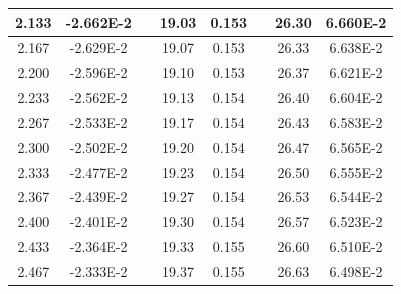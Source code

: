 \documentclass[article,12pt]{elsarticle}
\begin{document}
\begin{longtable}[c]{|c|c|cccccc}
2.133    & -2.662E-2 & \multicolumn{1}{c|}{} & \multicolumn{1}{c|}{19.03}   & \multicolumn{1}{c|}{0.153} & \multicolumn{1}{c|}{} & \multicolumn{1}{c|}{26.30}   & \multicolumn{1}{c|}{6.660E-2} \\ \hline
2.167    & -2.629E-2 & \multicolumn{1}{c|}{} & \multicolumn{1}{c|}{19.07}   & \multicolumn{1}{c|}{0.153} & \multicolumn{1}{c|}{} & \multicolumn{1}{c|}{26.33}   & \multicolumn{1}{c|}{6.638E-2} \\ \hline
2.200    & -2.596E-2 & \multicolumn{1}{c|}{} & \multicolumn{1}{c|}{19.10}   & \multicolumn{1}{c|}{0.153} & \multicolumn{1}{c|}{} & \multicolumn{1}{c|}{26.37}   & \multicolumn{1}{c|}{6.621E-2} \\ \hline
2.233    & -2.562E-2 & \multicolumn{1}{c|}{} & \multicolumn{1}{c|}{19.13}   & \multicolumn{1}{c|}{0.154} & \multicolumn{1}{c|}{} & \multicolumn{1}{c|}{26.40}   & \multicolumn{1}{c|}{6.604E-2} \\ \hline
2.267    & -2.533E-2 & \multicolumn{1}{c|}{} & \multicolumn{1}{c|}{19.17}   & \multicolumn{1}{c|}{0.154} & \multicolumn{1}{c|}{} & \multicolumn{1}{c|}{26.43}   & \multicolumn{1}{c|}{6.583E-2} \\ \hline
2.300    & -2.502E-2 & \multicolumn{1}{c|}{} & \multicolumn{1}{c|}{19.20}   & \multicolumn{1}{c|}{0.154} & \multicolumn{1}{c|}{} & \multicolumn{1}{c|}{26.47}   & \multicolumn{1}{c|}{6.565E-2} \\ \hline
2.333    & -2.477E-2 & \multicolumn{1}{c|}{} & \multicolumn{1}{c|}{19.23}   & \multicolumn{1}{c|}{0.154} & \multicolumn{1}{c|}{} & \multicolumn{1}{c|}{26.50}   & \multicolumn{1}{c|}{6.555E-2} \\ \hline
2.367    & -2.439E-2 & \multicolumn{1}{c|}{} & \multicolumn{1}{c|}{19.27}   & \multicolumn{1}{c|}{0.154} & \multicolumn{1}{c|}{} & \multicolumn{1}{c|}{26.53}   & \multicolumn{1}{c|}{6.544E-2} \\ \hline
2.400    & -2.401E-2 & \multicolumn{1}{c|}{} & \multicolumn{1}{c|}{19.30}   & \multicolumn{1}{c|}{0.154} & \multicolumn{1}{c|}{} & \multicolumn{1}{c|}{26.57}   & \multicolumn{1}{c|}{6.523E-2} \\ \hline
2.433    & -2.364E-2 & \multicolumn{1}{c|}{} & \multicolumn{1}{c|}{19.33}   & \multicolumn{1}{c|}{0.155} & \multicolumn{1}{c|}{} & \multicolumn{1}{c|}{26.60}   & \multicolumn{1}{c|}{6.510E-2} \\ \hline
2.467    & -2.333E-2 & \multicolumn{1}{c|}{} & \multicolumn{1}{c|}{19.37}   & \multicolumn{1}{c|}{0.155} & \multicolumn{1}{c|}{} & \multicolumn{1}{c|}{26.63}   & \multicolumn{1}{c|}{6.498E-2} \\ \hline

\end{longtable}
\end{document}
